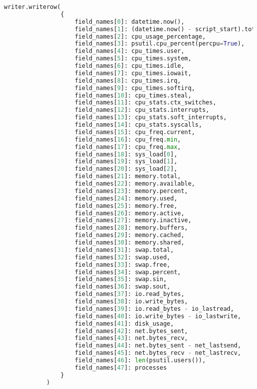 \begin{lstlisting}[caption={A monitorozáshoz készített, psutil csomagot használó Python-script, mely csv formátumban menti el a metrikákat.},label=lst:python-sysstats,language=Python]
            writer.writerow(
                {
                    field_names[0]: datetime.now(),
                    field_names[1]: (datetime.now() - script_start).total_seconds(),
                    field_names[2]: cpu_usage_percentage,
                    field_names[3]: psutil.cpu_percent(percpu=True),
                    field_names[4]: cpu_times.user,
                    field_names[5]: cpu_times.system,
                    field_names[6]: cpu_times.idle,
                    field_names[7]: cpu_times.iowait,
                    field_names[8]: cpu_times.irq,
                    field_names[9]: cpu_times.softirq,
                    field_names[10]: cpu_times.steal,
                    field_names[11]: cpu_stats.ctx_switches,
                    field_names[12]: cpu_stats.interrupts,
                    field_names[13]: cpu_stats.soft_interrupts,
                    field_names[14]: cpu_stats.syscalls,
                    field_names[15]: cpu_freq.current,
                    field_names[16]: cpu_freq.min,
                    field_names[17]: cpu_freq.max,
                    field_names[18]: sys_load[0],
                    field_names[19]: sys_load[1],
                    field_names[20]: sys_load[2],
                    field_names[21]: memory.total,
                    field_names[22]: memory.available,
                    field_names[23]: memory.percent,
                    field_names[24]: memory.used,
                    field_names[25]: memory.free,
                    field_names[26]: memory.active,
                    field_names[27]: memory.inactive,
                    field_names[28]: memory.buffers,
                    field_names[29]: memory.cached,
                    field_names[30]: memory.shared,
                    field_names[31]: swap.total,
                    field_names[32]: swap.used,
                    field_names[33]: swap.free,
                    field_names[34]: swap.percent,
                    field_names[35]: swap.sin,
                    field_names[36]: swap.sout,
                    field_names[37]: io.read_bytes,
                    field_names[38]: io.write_bytes,
                    field_names[39]: io.read_bytes - io_lastread,
                    field_names[40]: io.write_bytes - io_lastwrite,
                    field_names[41]: disk_usage,
                    field_names[42]: net.bytes_sent,
                    field_names[43]: net.bytes_recv,
                    field_names[44]: net.bytes_sent - net_lastsend,
                    field_names[45]: net.bytes_recv - net_lastrecv,
                    field_names[46]: len(psutil.users()),
                    field_names[47]: processes
                }
            )


\end{lstlisting}

